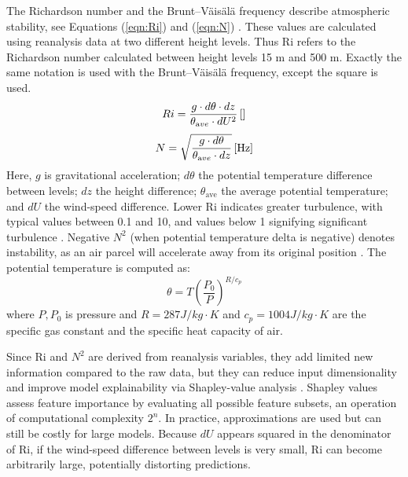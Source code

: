 The Richardson number and the Brunt–Väisälä frequency describe atmospheric stability, see Equations (\ref{eqn:Ri}) and (\ref{eqn:N}) \parencite{richardson_number_skybrary,brunt_vaisala_freq_eumtrain,mean_gust_HA_HO}. These values are calculated using reanalysis data at two different height levels. Thus Ri refers to the Richardson number calculated between height levels 15 m and 500 m. Exactly the same notation is used with the Brunt–Väisälä frequency, except the square is used.
%
\begin{equation}
  \label{eqn:Ri}
  Ri = \frac{g \cdot d\theta \cdot dz}{\theta_{\textrm ave} \cdot dU^2} \, \mathrm{[]}
\end{equation}
%
\begin{equation}
  \label{eqn:N}
  N = \sqrt{\frac{g \cdot d\theta }{\theta_{\textrm ave} \cdot dz}} \, \mathrm{[Hz]}
\end{equation}
%
Here, $g$ is gravitational acceleration; $d\theta$ the potential temperature difference between levels; $dz$ the height difference; $\theta_{\mathrm{ave}}$ the average potential temperature; and $dU$ the wind-speed difference. Lower Ri indicates greater turbulence, with typical values between 0.1 and 10, and values below 1 signifying significant turbulence \parencite{richardson_number_skybrary}. Negative $N^2$ (when potential temperature delta is negative) denotes instability, as an air parcel will accelerate away from its original position \parencite{brunt_vaisala_freq_eumtrain}. The potential temperature is computed as:
%
\begin{equation}
  \label{eqn:potential_temp}
  \theta = T\left(\dfrac{P_0}{P}\right)^{R/c_p}
\end{equation}
%
where $P, P_0$ is pressure and $R = 287 J/kg\cdot K$ and $c_p = 1004 J/kg\cdot K$ are the specific gas constant and the specific heat capacity of air.

Since Ri and $N^2$ are derived from reanalysis variables, they add limited new information compared to the raw data, but they can reduce input dimensionality and improve model explainability via Shapley-value analysis \parencite{shapley_information}. Shapley values assess feature importance by evaluating all possible feature subsets, an operation of computational complexity $2^n$. In practice, approximations are used but can still be costly for large models. Because $dU$ appears squared in the denominator of Ri, if the wind-speed difference between levels is very small, Ri can become arbitrarily large, potentially distorting predictions.

